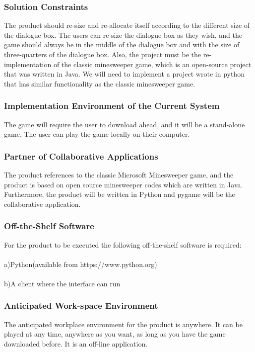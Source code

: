 \documentclass[10pt]{article}
\begin{document}
\subsubsection{Solution Constraints}
The product should re-size and re-allocate itself according to the different size of the dialogue box. The users can re-size the dialogue box as they wish, and the game should always be in the middle of the dialogue box and with the size of three-quarters of the dialogue box. \newline
Also, the project must be the re-implementation of the classic minesweeper game, which is an open-source project that was written in Java. We will need to implement a project wrote in python that has similar functionality as the classic minesweeper game.\newline

\subsubsection{Implementation Environment of the Current System}
The game will require the user to download ahead, and it will be a stand-alone game. The user can play the game locally on their computer.
\subsubsection{Partner of Collaborative Applications}
The product references to the classic Microsoft Minesweeper game, and the product is based on open source minesweeper codes which are written in Java.  Furthermore, the product will be written in Python and pygame will be the collaborative application.
\subsubsection{Off-the-Shelf Software}
For the product to be executed the following off-the-shelf software is required:\\\\
a)Python(available from https://www.python.org)\\
\\
b)A client where the interface can run
\subsubsection{Anticipated Work-space Environment}
The anticipated workplace environment for the product is anywhere. It can be played at any time, anywhere as you want, as long as you have the game downloaded before. It is an off-line application.
\end{document}
